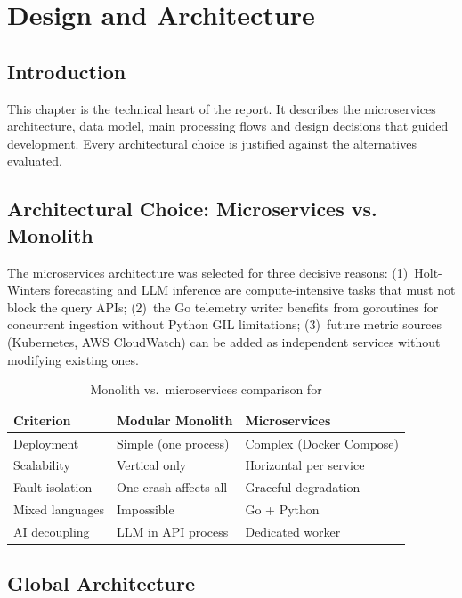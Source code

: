 \chapter{Design and Architecture}

\section*{Introduction}

This chapter is the technical heart of the report. It describes the \caimp{}
microservices architecture, data model, main processing flows and design decisions
that guided development. Every architectural choice is justified against the
alternatives evaluated.

\section{Architectural Choice: Microservices vs. Monolith}

The microservices architecture was selected for three decisive reasons:
(1)~Holt-Winters forecasting and LLM inference are compute-intensive tasks that
must not block the query APIs;
(2)~the Go telemetry writer benefits from goroutines for concurrent ingestion
without Python GIL limitations;
(3)~future metric sources (Kubernetes, AWS CloudWatch) can be added as independent
services without modifying existing ones.

\begin{table}[H]
\centering
\caption{Monolith vs.\ microservices comparison for \caimp{}}
\label{tab:arch-choice}
\small
\begin{tabularx}{\textwidth}{lXX}
\toprule
\textbf{Criterion} & \textbf{Modular Monolith} & \textbf{Microservices} \\
\midrule
Deployment       & Simple (one process)        & Complex (Docker Compose) \\
Scalability      & Vertical only               & Horizontal per service \\
Fault isolation  & One crash affects all       & Graceful degradation \\
Mixed languages  & Impossible                  & Go + Python \\
AI decoupling    & LLM in API process          & Dedicated worker \\
\bottomrule
\end{tabularx}
\end{table}

\section{Global Architecture}

